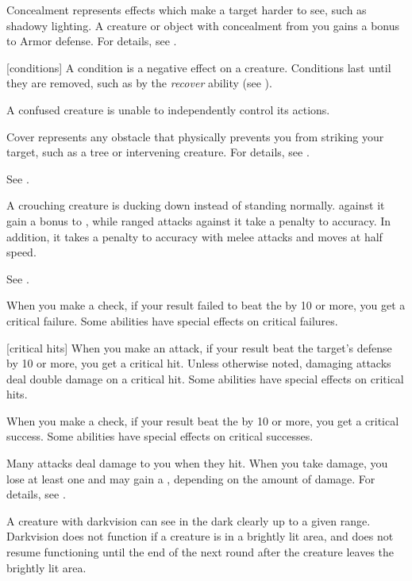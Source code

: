  Concealment represents effects which make a target harder to see, such as shadowy lighting.
A creature or object with concealment from you gains a  bonus to Armor defense.
For details, see .

[conditions] A condition is a negative effect on a creature.
Conditions last until they are removed, such as by the \textit{recover} ability (see ).

 A confused creature is unable to independently control its actions. \confusionexplanation

 Cover represents any obstacle that physically prevents you from striking your target, such as a tree or intervening creature.
For details, see .

 See .

 A crouching creature is ducking down instead of standing normally.
 against it gain a  bonus to , while  ranged attacks against it take a  penalty to accuracy.
In addition, it takes a  penalty to accuracy with melee attacks and moves at half speed.

 See .

 When you make a check, if your result failed to beat the  by 10 or more, you get a critical failure.
Some abilities have special effects on critical failures.

[critical hits] When you make an attack, if your result beat the target's defense by 10 or more, you get a critical hit.
Unless otherwise noted, damaging attacks deal double damage on a critical hit.
Some abilities have special effects on critical hits.

 When you make a check, if your result beat the  by 10 or more, you get a critical success.
Some abilities have special effects on critical successes.

 Many attacks deal damage to you when they hit.
When you take damage, you lose at least one  and may gain a , depending on the amount of damage.
For details, see .

 A creature with darkvision can see in the dark clearly up to a given range.
Darkvision does not function if a creature is in a brightly lit area, and does not resume functioning until the end of the next round after the creature leaves the brightly lit area.

